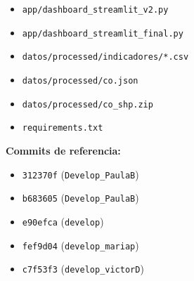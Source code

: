 \documentclass[12pt,letterpaper]{article}
\begin{document}
\begin{itemize}
    \item \texttt{app/dashboard\_streamlit\_v2.py}
    \item \texttt{app/dashboard\_streamlit\_final.py}
    \item \texttt{datos/processed/indicadores/*.csv}
    \item \texttt{datos/processed/co.json}
    \item \texttt{datos/processed/co\_shp.zip}
    \item \texttt{requirements.txt}
\end{itemize}

\textbf{Commits de referencia:}

\begin{itemize}
    \item \texttt{312370f} (\texttt{Develop\_PaulaB})
    \item \texttt{b683605} (\texttt{Develop\_PaulaB})
    \item \texttt{e90efca} (\texttt{develop})
    \item \texttt{fef9d04} (\texttt{develop\_mariap})
    \item \texttt{c7f53f3} (\texttt{develop\_victorD})
\end{itemize}
\end{document}
